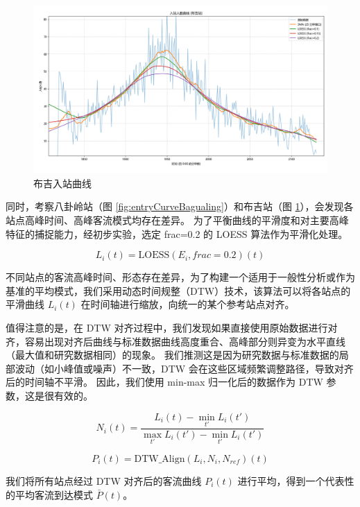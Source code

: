 \begin{figure}[htbp]
    \centering
    \includegraphics[width=1.0\textwidth]{res/Figure_3.png}
    \caption{布吉入站曲线}
    \label{fig:entryCurveBuji}
\end{figure}

同时，考察八卦岭站（图 \ref{fig:entryCurveBagualing}）和布吉站（图 \ref{fig:entryCurveBuji}），会发现各站点高峰时间、高峰客流模式均存在差异。
为了平衡曲线的平滑度和对主要高峰特征的捕捉能力，经初步实验，选定 frac=0.2 的 LOESS 算法作为平滑化处理。

$$
L_i(t) = \text{LOESS}(E_i, frac=0.2)(t)
$$

不同站点的客流高峰时间、形态存在差异，为了构建一个适用于一般性分析或作为基准的平均模式，我们采用动态时间规整（DTW）\cite{DTW}技术，该算法可以将各站点的平滑曲线 $L_i(t)$ 在时间轴进行缩放，向统一的某个参考站点对齐。

值得注意的是，在 DTW 对齐过程中，我们发现如果直接使用原始数据进行对齐，容易出现对齐后曲线与标准数据曲线高度重合、高峰部分则异变为水平直线（最大值和研究数据相同）的现象。
我们推测这是因为研究数据与标准数据的局部波动（如小峰值或噪声）不一致，DTW 会在这些区域频繁调整路径，导致对齐后的时间轴不平滑。
因此，我们使用 min-max 归一化后的数据作为 DTW 参数，这是很有效的。

$$
N_i(t) = \frac{L_i(t) - \min_{t'}L_i(t')}{\max_{t'}L_i(t') - \min_{t'}L_i(t')}
$$

$$
P_i(t) = \text{DTW\_Align}(L_i, N_i, N_{ref})(t)
$$

我们将所有站点经过 DTW 对齐后的客流曲线 $P_i(t)$ 进行平均，得到一个代表性的平均客流到达模式 $\bar{P}(t)$。

